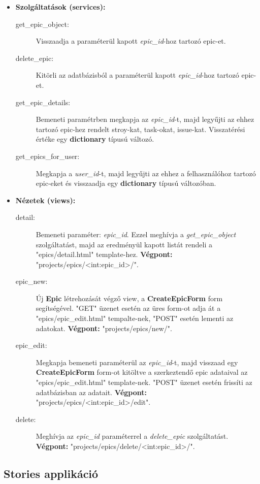 \begin{itemize}
	\item \textbf{Szolgáltatások (services):}
	\begin{description}
		\item[get\_epic\_object:] Visszaadja a paraméterül kapott \textit{epic\_id}-hoz tartozó epic-et.
		\item[delete\_epic:] Kitörli az adatbázisból a paraméterül kapott \textit{epic\_id}-hoz tartozó epic-et.
		\item[get\_epic\_details:] Bemeneti paramétrben megkapja az  \textit{epic\_id}-t, majd legyűjti az ehhez tartozó epic-hez rendelt stroy-kat, task-okat, issue-kat. Visszatérési értéke egy \textbf{dictionary} típusú változó.
		\item[get\_epics\_for\_user:] Megkapja a \textit{user\_id}-t, majd legyűjti az ehhez a felhasználóhoz tartozó epic-eket és visszaadja egy \textbf{dictionary} típusú változóban.
	\end{description}
	\item \textbf{Nézetek (views):}
	\begin{description}
		\item[detail:] Bemeneti paraméter: \textit{epic\_id}. Ezzel meghívja a \textit{get\_epic\_object} szolgáltatást, majd az eredményül kapott listát rendeli a "epics/detail.html" template-hez. \textbf{Végpont:} "projects/epics/<int:epic\_id>/".
		\item[epic\_new:] Új \textbf{Epic} létrehozását végző view, a \textbf{CreateEpicForm} form segítségével. "GET" üzenet esetén az üres form-ot adja át a "epics/epic\_edit.html" tempalte-nek, "POST" esetén lementi az adatokat. \textbf{Végpont:} "projects/epics/new/".
		\item[epic\_edit:] Megkapja bemeneti paraméterül az \textit{epic\_id}-t, majd visszaad egy \textbf{CreateEpicForm} form-ot kitöltve a szerkeztendő epic adataival az "epics/epic\_edit.html" template-nek. "POST" üzenet esetén frissíti az adatbázisban az adatait. \textbf{Végpont:} "projects/epics/<int:epic\_id>/edit".
		\item[delete:] Meghívja az \textit{epic\_id} paraméterrel a \textit{delete\_epic} szolgáltatást. \textbf{Végpont:} "projects/epics/delete/<int:epic\_id>/".
	\end{description}
\end{itemize}


\subsection{Stories applikáció}

